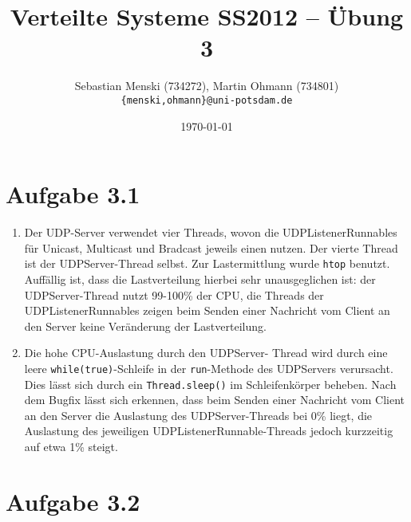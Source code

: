 \documentclass[german,12pt,a4paper]{article}
\begin{document}
\title{\textbf{Verteilte Systeme SS2012 -- Übung 3}}
\author{Sebastian Menski (734272), Martin Ohmann (734801) \\ \texttt{\{menski,ohmann\}@uni-potsdam.de}}
\date{\today}

\maketitle

\section*{Aufgabe 3.1}

\begin{enumerate}

	\item Der UDP-Server verwendet vier Threads, wovon die UDPListenerRunnables für Unicast, Multicast und Bradcast jeweils einen nutzen.
	Der vierte Thread ist der UDPServer-Thread selbst. Zur Lastermittlung wurde \texttt{htop} benutzt. Auffällig ist, dass die Lastverteilung hierbei sehr unausgeglichen ist: der UDPServer-Thread nutzt 99-100\% 
	der CPU, die Threads der UDPListenerRunnables zeigen beim Senden einer Nachricht vom Client an den Server keine Veränderung der Lastverteilung.
	
	\item Die hohe CPU-Auslastung durch den UDPServer- Thread wird durch eine leere \texttt{while(true)}-Schleife in der \texttt{run}-Methode des UDPServers verursacht. 
	Dies lässt sich durch ein \texttt{Thread.sleep()} im Schleifenkörper beheben. Nach dem Bugfix lässt sich erkennen, dass beim Senden einer Nachricht vom Client an den Server die Auslastung des UDPServer-Threads bei 
	0\% liegt, die Auslastung des jeweiligen UDPListenerRunnable-Threads jedoch kurzzeitig auf etwa 1\% steigt.

\end{enumerate}

\section*{Aufgabe 3.2}
\end{document}
